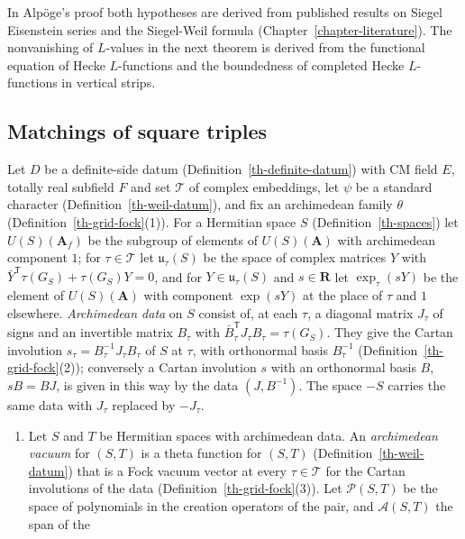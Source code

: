 In Alpöge's proof both hypotheses are derived from published results on
Siegel Eisenstein series and the Siegel-Weil formula
(Chapter~\ref{chapter-literature}). The nonvanishing of $L$-values in the next
theorem is derived from the functional equation of Hecke $L$-functions and the
boundedness of completed Hecke $L$-functions in vertical strips.

\subsection{Matchings of square triples}\label{subsection-th-square-matchings}

\begin{definition}\label{th-first-lift-matching}
Let $D$ be a definite-side datum (Definition~\ref{th-definite-datum}) with CM
field $E$, totally real subfield $F$ and set $\mathcal T$ of complex
embeddings, let $\psi$ be a standard character
(Definition~\ref{th-weil-datum}), and fix an archimedean family $\theta$
(Definition~\ref{th-grid-fock}(1)). For a Hermitian space $S$
(Definition~\ref{th-spaces}) let $U(S)(\mathbf A_f)$ be the subgroup of
elements of $U(S)(\mathbf A)$ with archimedean component $1$; for
$\tau\in\mathcal T$ let $\mathfrak u_\tau(S)$ be the space of complex matrices
$Y$ with $\bar Y^{\mathsf T}\tau(G_S)+\tau(G_S)Y=0$, and for
$Y\in\mathfrak u_\tau(S)$ and $s\in\mathbf R$ let $\exp_\tau(sY)$ be the element
of $U(S)(\mathbf A)$ with component $\exp(sY)$ at the place of $\tau$ and $1$
elsewhere. \emph{Archimedean data} on $S$ consist of, at each $\tau$, a
diagonal matrix $J_\tau$ of signs and an invertible matrix $B_\tau$ with
$\bar B_\tau^{\mathsf T}J_\tau B_\tau=\tau(G_S)$. They give the Cartan
involution $s_\tau=B_\tau^{-1}J_\tau B_\tau$ of $S$ at $\tau$, with orthonormal
basis $B_\tau^{-1}$ (Definition~\ref{th-grid-fock}(2)); conversely a Cartan
involution $s$ with an orthonormal basis $B$, $sB=BJ$, is given in this way by
the data $(J,B^{-1})$. The space $-S$ carries the same data with $J_\tau$
replaced by $-J_\tau$.
\begin{enumerate}
\item Let $S$ and $T$ be Hermitian spaces with archimedean data. An
  \emph{archimedean vacuum} for $(S,T)$ is a theta function for $(S,T)$
  (Definition~\ref{th-weil-datum}) that is a Fock vacuum vector at every
  $\tau\in\mathcal T$ for the Cartan involutions of the data
  (Definition~\ref{th-grid-fock}(3)). Let $\mathcal P(S,T)$ be the space of polynomials
  in the creation operators of the pair, and $\mathcal A(S,T)$ the span of the

\end{enumerate}
\end{definition}
